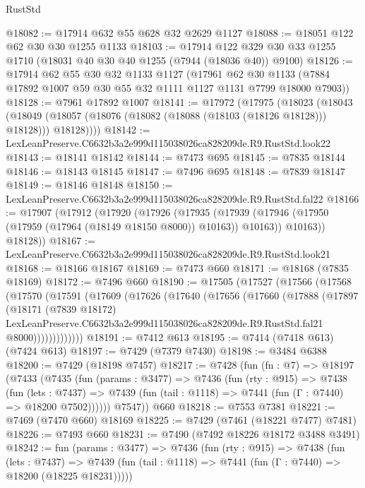 \begin{lexlean}{RustStd}
\begin{coremodule}
@18082 := @17914 @632 @55 @628 @32 @2629 @1127
@18088 := @18051 @122 @62 @30 @30 @1255 @1133
@18103 := @17914 @122 @329 @30 @33 @1255 @1710 (@18031 @40 @30 @40 @1255 (@7944 (@18036 @40)) @9100)
@18126 := @17914
    @62
    @55
    @30
    @32
    @1133
    @1127
    (@17961 @62 @30 @1133 (@7884 @17892 @1007 @59 @30 @55 @32 @1111 @1127 @1131 @7799 @18000 @7903))
@18128 := @7961 @17892 @1007
@18141 := @17972
    (@17975
      (@18023
        (@18043
          (@18049 (@18057 (@18076 (@18082 (@18088 (@18103 (@18126 @18128))) @18128))) @18128))))
@18142 := LexLeanPreserve.C6632b3a2e999d115038026ca828209de.R9.RustStd.look22
@18143 := @18141 @18142
@18144 := @7473 @695
@18145 := @7835 @18144
@18146 := @18143 @18145
@18147 := @7496 @695
@18148 := @7839 @18147
@18149 := @18146 @18148
@18150 := LexLeanPreserve.C6632b3a2e999d115038026ca828209de.R9.RustStd.fal22
@18166 := @17907
    (@17912
      (@17920
        (@17926
          (@17935
            (@17939 (@17946 (@17950 (@17959 (@17964 (@18149 @18150 @8000)) @10163)) @10163))
            @10163))
        @18128))
@18167 := LexLeanPreserve.C6632b3a2e999d115038026ca828209de.R9.RustStd.look21
@18168 := @18166 @18167
@18169 := @7473 @660
@18171 := @18168 (@7835 @18169)
@18172 := @7496 @660
@18190 := @17505
    (@17527
      (@17566
        (@17568
          (@17570
            (@17591
              (@17609
                (@17626
                  (@17640
                    (@17656
                      (@17660
                        (@17888
                          (@17897
                            (@18171
                              (@7839 @18172)
                              LexLeanPreserve.C6632b3a2e999d115038026ca828209de.R9.RustStd.fal21
                              @8000)))))))))))))
@18191 := @7412 @613
@18195 := @7414 (@7418 @613) (@7424 @613)
@18197 := @7429 (@7379 @7430)
@18198 := @3484 @6388
@18200 := @7429 (@18198 @7457)
@18217 := @7428
    (fun (fn : @7) =>
    @18197
      (@7433
        (@7435
          (fun (params : @3477) =>
          @7436
            (fun (rty : @915) =>
            @7438
              (fun (lets : @7437) =>
              @7439 (fun (tail : @1118) => @7441 (fun (Γ : @7440) => @18200 @7502))))))
        @7547))
    @660
@18218 := @7553 @7381
@18221 := @7469 (@7470 @660) @18169
@18225 := @7429 (@7461 (@18221 @7477) @7481)
@18226 := @7493 @660
@18231 := @7490 (@7492 @18226 @18172 @3488 @3491)
@18242 := fun (params : @3477) =>
  @7436
    (fun (rty : @915) =>
    @7438
      (fun (lets : @7437) =>
      @7439 (fun (tail : @1118) => @7441 (fun (Γ : @7440) => @18200 (@18225 @18231)))))

\end{coremodule}
\end{lexlean}
